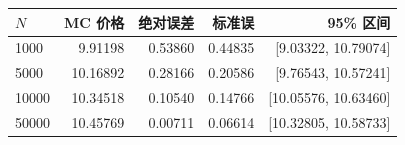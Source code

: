 \begin{tabular}{lrrrr}
\toprule
$N$ & MC 价格 & 绝对误差 & 标准误 & 95\% 区间 \\
\midrule
1000 & 9.91198 & 0.53860 & 0.44835 & [9.03322, 10.79074] \\
5000 & 10.16892 & 0.28166 & 0.20586 & [9.76543, 10.57241] \\
10000 & 10.34518 & 0.10540 & 0.14766 & [10.05576, 10.63460] \\
50000 & 10.45769 & 0.00711 & 0.06614 & [10.32805, 10.58733] \\
\bottomrule
\end{tabular}
